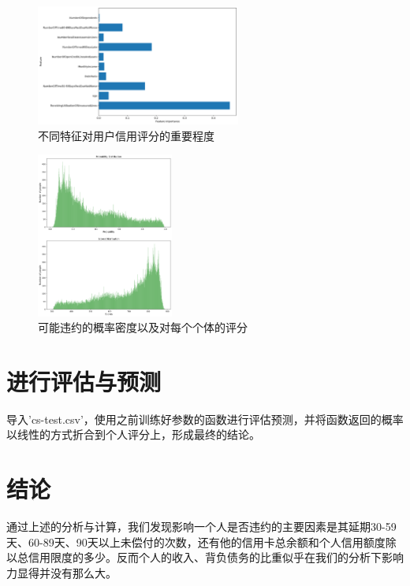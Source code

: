 \documentclass[UTF8,a4paper,10pt]{ctexart}
\begin{document}
\begin{figure}[htbp]
	\centering
	\includegraphics[width=0.6\textwidth]{imp.png} %
	\caption{不同特征对用户信用评分的重要程度} %
	\label{9} %
\end{figure}

\begin{figure}[htbp]
	\centering
	\includegraphics[width=0.4\textwidth]{pp.png} %
	\caption{可能违约的概率密度以及对每个个体的评分} %
	\label{10} %
\end{figure}

\section{进行评估与预测}
导入'cs-test.csv'，使用之前训练好参数的函数进行评估预测，并将函数返回的概率以线性的方式折合到个人评分上，形成最终的结论。

\section{结论}
通过上述的分析与计算，我们发现影响一个人是否违约的主要因素是其延期30-59天、60-89天、90天以上未偿付的次数，还有他的信用卡总余额和个人信用额度除以总信用限度的多少。反而个人的收入、背负债务的比重似乎在我们的分析下影响力显得并没有那么大。
\end{document}
